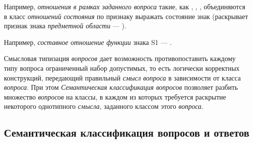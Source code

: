 Например, \textit{отношения в рамках заданного вопроса} такие, как , , , объединяются в класс \textit{отношений состояния} по признаку выражать состояние знак (раскрывает признак знака \textit{предметной области} --- ).

\begin{SCn}
\end{SCn}

Например, \textit{составное отношение функции} знака S1 --- .

Смысловая типизация \textit{вопросов} дает возможность противопоставить каждому типу вопроса ограниченный набор допустимых, то есть логически корректных конструкций, передающий правильный \textit{смысл} \textit{вопроса} в зависимости от класса \textit{вопроса}. При этом \textit{Семантическая классификация вопросов} позволяет разбить множество \textit{вопросов} на классы, в каждом из которых требуется раскрытие некоторого однотипного \textit{смысла}, заданного классом этого \textit{вопроса}. 

\subsection{Семантическая классификация вопросов и ответов}
\label{chapter_questions_sec_sem_classification}

